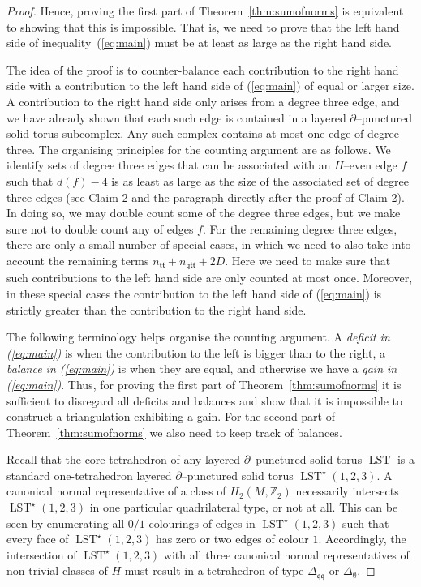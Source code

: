 \documentclass[a4paper]{gtart}
\def\lst{\operatorname{LST}}
\def\manifold{M}
\def\Z{\mathbb{Z}}
\def\Tee{\Delta_{\emptyset}}
\def\Tqq{\Delta_{\mathfrak{qq}}}
\def\ntt{n_{\mathfrak{tt}}}
\def\nqtt{n_{\mathfrak{qtt}}}
\theoremstyle{plain}
\theoremstyle{definition}
\theoremstyle{remark}
\numberwithin{equation}{section}
\begin{document}
\begin{proof}
Hence, proving the first part of Theorem~\ref{thm:sumofnorms} is equivalent to showing that this is impossible. That is, we need to prove that the left hand side of inequality~(\ref{eq:main}) must be at least as large as the right hand side.

The idea of the proof is to counter-balance each contribution to the right hand side with a contribution to the left hand side of (\ref{eq:main}) of equal or larger size. A contribution to the right hand side only arises from a degree three edge, and we have already shown that each such edge is contained in a layered $\partial$--punctured solid torus subcomplex. Any such complex contains at most one edge of degree three. The organising principles for the counting argument are as follows. We identify sets of degree three edges that can be associated with an $H$--even edge $f$ such that 
$d(f)-4$ is as least as large as the size of the associated set of degree three edges (see Claim 2 and the paragraph directly after the proof of Claim 2). 
In doing so, we may double count some of the degree three edges, but we make sure not to double count any of edges $f$.
For the remaining degree three edges, there are only a small number of special cases, in which we need to also take into account the remaining terms $\ntt+\nqtt+2 D$. 
Here we need to make sure that such contributions to the left hand side are only counted at most once. Moreover, in these special cases the contribution to the left hand side of (\ref{eq:main}) is strictly greater than the contribution to the right hand side. 

The following terminology helps organise the counting argument.
A \emph{deficit in (\ref{eq:main})} is when the contribution to the left is bigger than to the right, a \emph{balance in (\ref{eq:main})} is when they are equal, and otherwise we have a \emph{gain in (\ref{eq:main})}. Thus, for proving the first part of Theorem~\ref{thm:sumofnorms} it is sufficient to disregard all deficits and balances and show that it is impossible to construct a triangulation exhibiting a gain. For the second part of Theorem~\ref{thm:sumofnorms} we also need to keep track of balances.

Recall that the core tetrahedron of any layered $\partial$--punctured solid torus $\lst$ is a standard one-tetrahedron layered $\partial$--punctured solid torus $\lst^\star(1, 2, 3).$ A canonical normal representative of a class of $H_2 (\manifold,\Z_2)$ necessarily intersects $\lst^\star(1, 2, 3)$ in one particular quadrilateral type, or not at all. This can be seen by enumerating all $0/1$-colourings of edges in $\lst^\star(1, 2, 3)$ such that every face of $\lst^\star(1, 2, 3)$ has zero or two edges of colour $1$. Accordingly, the intersection of $\lst^\star(1, 2, 3)$ with all three canonical normal representatives of non-trivial classes of $H$ must result in a tetrahedron of type $\Tqq$ or $\Tee$. 


\end{proof}
\end{document}
